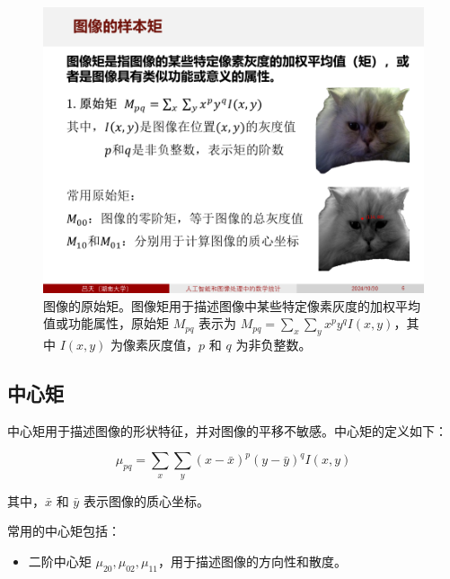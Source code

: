 \documentclass[
    report,     %
    oneside,    %
    UTF8,       %
    zihao=-4    %
]{config} %
\begin{document}
\begin{figure}[H] %
    \centering %
    \includegraphics[width=\linewidth]{figures/图像数据的处理方式/4.PNG}
    \caption[图像的原始矩]{图像的原始矩。图像矩用于描述图像中某些特定像素灰度的加权平均值或功能属性，原始矩 $M_{pq}$ 表示为 $M_{pq} = \sum_x \sum_y x^p y^q I(x,y)$，其中 $I(x,y)$ 为像素灰度值，$p$ 和 $q$ 为非负整数。}
\end{figure}
\vspace{-0.7em}

\subsection{中心矩}

中心矩用于描述图像的形状特征，并对图像的平移不敏感。中心矩的定义如下：

\begin{equation}
\mu_{pq} = \sum_x \sum_y (x - \bar{x})^p (y - \bar{y})^q I(x, y)
\end{equation}

其中，\( \bar{x} \) 和 \( \bar{y} \) 表示图像的质心坐标。

常用的中心矩包括：
\begin{itemize}
    \item 二阶中心矩 \( \mu_{20}, \mu_{02}, \mu_{11} \)，用于描述图像的方向性和散度。
\end{itemize}
\end{document}
